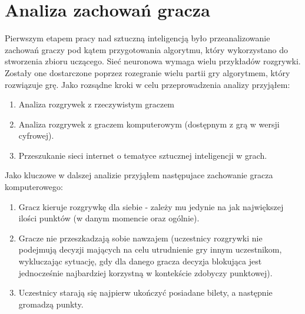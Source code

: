 \documentclass[12pt, oneside]{report}
\begin{document}
\section{Analiza zachowań gracza}
Pierwszym etapem pracy nad sztuczną inteligencją było przeanalizowanie zachowań graczy pod kątem przygotowania algorytmu, który wykorzystano do stworzenia zbioru uczącego. Sieć neuronowa wymaga wielu przykładów rozgrywki. Zostały one dostarczone poprzez rozegranie wielu partii gry algorytmem, który rozwiązuje grę. Jako rozsądne kroki w celu przeprowadzenia analizy przyjąłem:
	\begin{enumerate}
		\item{Analiza rozgrywek z rzeczywistym graczem}
		\item{Analiza rozgrywek z graczem komputerowym (dostępnym z grą w wersji cyfrowej)}.
		\item{Przeszukanie sieci internet o tematyce sztucznej inteligencji w grach}. 
	\end{enumerate}
Jako kluczowe w dalszej analizie przyjąłem następujace zachowanie gracza komputerowego:
\begin{enumerate}
	\item Gracz kieruje rozgrywkę dla siebie - zależy mu jedynie na jak największej ilości punktów (w danym momencie oraz ogólnie).
	\item Gracze nie przeszkadzają sobie nawzajem (uczestnicy rozgrywki nie podejmują decyzji mających na celu utrudnienie gry innym uczestnikom, wykluczając sytuację, gdy dla danego gracza decyzja blokująca jest jednocześnie najbardziej korzystną w kontekście zdobyczy punktowej).
	\item Uczestnicy starają się najpierw ukończyć posiadane bilety, a następnie gromadzą punkty.
\end{enumerate}
\end{document}
